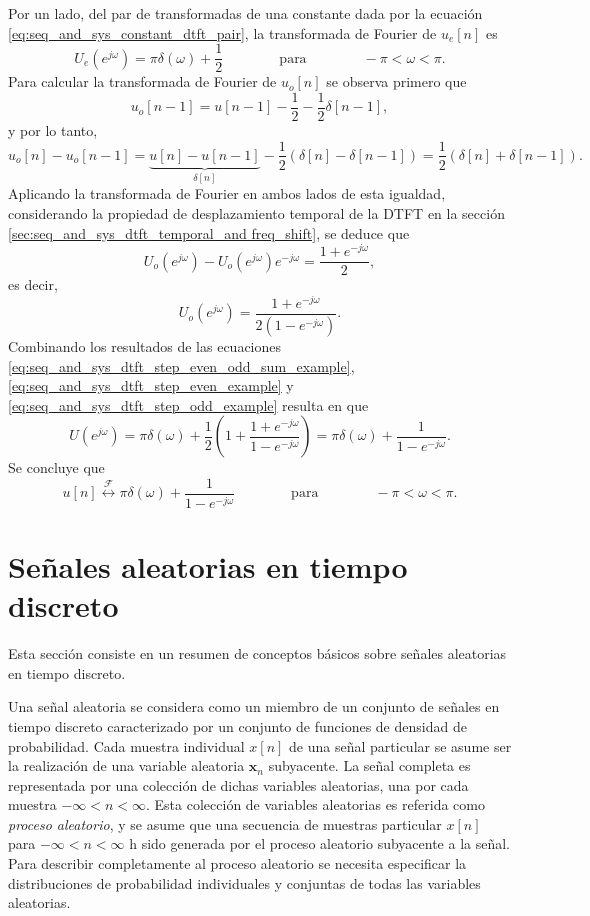 \documentclass[a4paper]{report}
\newcommand{\x}{\mathbf{x}}
\begin{document}
Por un lado, del par de transformadas de una constante dada por la ecuación \ref{eq:seq_and_sys_constant_dtft_pair}, la transformada de Fourier de \(u_e[n]\) es
\begin{equation}\label{eq:seq_and_sys_dtft_step_even_example}
 U_e(e^{j\omega})=\pi\delta(\omega)+\frac{1}{2}
 \qquad\qquad\textrm{para}\qquad\qquad 
 -\pi<\omega<\pi.
\end{equation}
Para calcular la transformada de Fourier de \(u_o[n]\) se observa primero que 
\[
 u_o[n-1]=u[n-1]-\frac{1}{2}-\frac{1}{2}\delta[n-1],
\]
y por lo tanto,
\[
 u_o[n]-u_o[n-1]=\underbrace{u[n]-u[n-1]}_{\displaystyle\delta[n]}-\frac{1}{2}(\delta[n]-\delta[n-1])=
 \frac{1}{2}(\delta[n]+\delta[n-1]).
\]
Aplicando la transformada de Fourier en ambos lados de esta igualdad, considerando la propiedad de desplazamiento temporal de la DTFT en la sección \ref{sec:seq_and_sys_dtft_temporal_and freq_shift}, se deduce que 
\[
 U_o(e^{j\omega})-U_o(e^{j\omega})e^{-j\omega}=\frac{1+e^{-j\omega}}{2},
\]
es decir, 
\begin{equation}\label{eq:seq_and_sys_dtft_step_odd_example}
 U_o(e^{j\omega})=\frac{1+e^{-j\omega}}{2(1-e^{-j\omega})}. 
\end{equation}
Combinando los resultados de las ecuaciones \ref{eq:seq_and_sys_dtft_step_even_odd_sum_example}, \ref{eq:seq_and_sys_dtft_step_even_example} y \ref{eq:seq_and_sys_dtft_step_odd_example} resulta en que 
\[
 U(e^{j\omega})=\pi\delta(\omega)+\frac{1}{2}\left(1+\frac{1+e^{-j\omega}}{1-e^{-j\omega}}\right)
  =\pi\delta(\omega)+\frac{1}{1-e^{-j\omega}}.
\]
Se concluye que 
\begin{equation}\label{eq:seq_and_sys_step_dtft}
 u[n]\overset{\mathcal{F}}{\longleftrightarrow}\pi\delta(\omega)+\frac{1}{1-e^{-j\omega}}
 \qquad\qquad\textrm{para}\qquad\qquad 
 -\pi<\omega<\pi.
\end{equation}

\section{Señales aleatorias en tiempo discreto} 
 
Esta sección consiste en un resumen de conceptos básicos sobre señales aleatorias en tiempo discreto.
 
Una señal aleatoria se considera como un miembro de un conjunto de señales en tiempo discreto caracterizado por un conjunto de funciones de densidad de probabilidad. Cada muestra individual \(x[n]\) de una señal particular se asume ser la realización de una variable aleatoria \(\x_n\) subyacente. La señal completa es representada por una colección de dichas variables aleatorias, una por cada muestra \(-\infty<n<\infty\). Esta colección de variables aleatorias es referida como \emph{proceso aleatorio}, y se asume que una secuencia de muestras particular \(x[n]\) para \(-\infty<n<\infty\) h sido generada por el proceso aleatorio subyacente a la señal. Para describir completamente al proceso aleatorio se necesita especificar la distribuciones de probabilidad individuales y conjuntas de todas las variables aleatorias.
\end{document}
